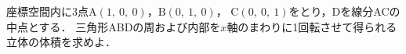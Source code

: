 ﻿\documentclass[../../../uem_tok_q.tex]{subfiles}
\begin{document}
    座標空間内に3点$\mathrm{A}(1,\:0,\:0)$，$\mathrm{B}(0,\:1,\:0)$，%
    $\mathrm{C}(0,\:0,\:1)$をとり，Dを線分ACの中点とする．%
    三角形ABDの周および内部を$x$軸のまわりに1回転させて得られる立体の体積を求めよ．
\end{document}
